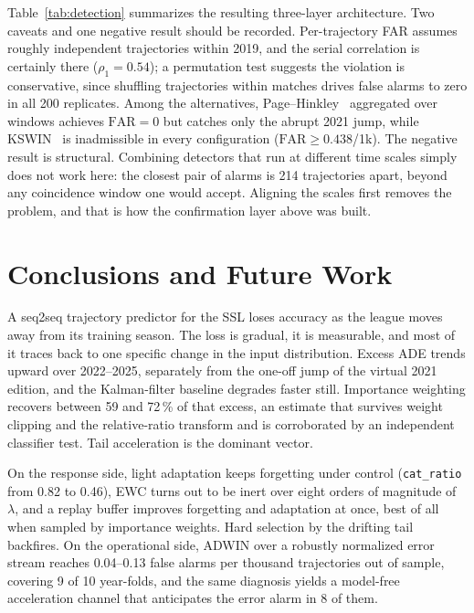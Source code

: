 \documentclass[runningheads]{llncs}
\begin{document}
Table~\ref{tab:detection} summarizes the resulting three-layer architecture.
Two caveats and one negative result should be recorded. Per-trajectory FAR
assumes roughly independent trajectories within 2019, and the serial
correlation is certainly there ($\rho_1 = 0.54$); a permutation test suggests
the violation is conservative, since shuffling trajectories within matches
drives false alarms to zero in all 200 replicates. Among the alternatives,
Page--Hinkley~\cite{page_hinkley} aggregated over windows achieves
$\mathrm{FAR} = 0$ but catches only the abrupt 2021 jump, while
KSWIN~\cite{kswin} is inadmissible in every configuration
($\mathrm{FAR} \geq 0.438$/1k). The negative result is structural. Combining
detectors that run at different time scales simply does not work here: the
closest pair of alarms is 214 trajectories apart, beyond any coincidence window
one would accept. Aligning the scales first removes the problem, and that is
how the confirmation layer above was built.

\section{Conclusions and Future Work}
\label{sec:conclusion}

A seq2seq trajectory predictor for the SSL loses accuracy as the league moves
away from its training season. The loss is gradual, it is measurable, and most
of it traces back to one specific change in the input distribution. Excess ADE
trends upward over 2022--2025, separately from the one-off jump of the virtual
2021 edition, and the Kalman-filter baseline degrades faster still. Importance
weighting recovers between 59 and 72\,\% of that excess, an estimate that
survives weight clipping and the relative-ratio transform and is corroborated
by an independent classifier test. Tail acceleration is the dominant vector.

On the response side, light adaptation keeps forgetting under control
(\texttt{cat\_ratio} from 0.82 to 0.46), EWC turns out to be inert over eight
orders of magnitude of $\lambda$, and a replay buffer improves forgetting and
adaptation at once, best of all when sampled by importance weights. Hard
selection by the drifting tail backfires. On the operational side, ADWIN over a
robustly normalized error stream reaches 0.04--0.13 false alarms per thousand
trajectories out of sample, covering 9 of 10 year-folds, and the same diagnosis
yields a model-free acceleration channel that anticipates the error alarm in 8
of them.
\end{document}

